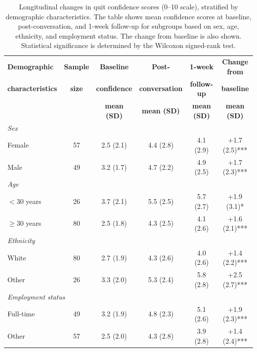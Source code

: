 \begin{table}[ht!]
  \centering
  \small
  \renewcommand{\arraystretch}{1.1}
  \begin{tabular*}{\linewidth}{@{\extracolsep{\fill}}lccccc@{}}
    \toprule
    \textbf{Demographic} & \textbf{Sample} & \textbf{Baseline} & \textbf{Post-} & \textbf{1-week} & \textbf{Change from} \\
    \textbf{characteristics} & \textbf{size} & \textbf{confidence} & \textbf{conversation} & \textbf{follow-up} & \textbf{baseline} \\
    & & \textbf{mean (SD)} & \textbf{mean (SD)} & \textbf{mean (SD)} & \textbf{mean (SD)} \\
    \midrule
    \multicolumn{6}{l}{\textit{Sex}} \\
    \quad Female & 57 & 2.5 (2.1) & 4.4 (2.8) & 4.1 (2.9) & +1.7 (2.5)*** \\
    \quad Male & 49 & 3.2 (1.7) & 4.7 (2.2) & 4.9 (2.5) & +1.7 (2.3)*** \\
    \midrule
    \multicolumn{6}{l}{\textit{Age}} \\
    \quad $<30$ years & 26 & 3.7 (2.1) & 5.5 (2.5) & 5.7 (2.7) & +1.9 (3.1)* \\
    \quad $\geq30$ years & 80 & 2.5 (1.8) & 4.3 (2.5) & 4.1 (2.6) & +1.6 (2.1)*** \\
    \midrule
    \multicolumn{6}{l}{\textit{Ethnicity}} \\
    \quad White & 80 & 2.7 (1.9) & 4.3 (2.6) & 4.0 (2.6) & +1.4 (2.2)*** \\
    \quad Other & 26 & 3.3 (2.0) & 5.3 (2.4) & 5.8 (2.8) & +2.5 (2.7)*** \\
    \midrule
    \multicolumn{6}{l}{\textit{Employment status}} \\
    \quad Full-time & 49 & 3.2 (1.9) & 4.8 (2.3) & 5.1 (2.6) & +1.9 (2.3)*** \\
    \quad Other & 57 & 2.5 (2.0) & 4.3 (2.8) & 3.9 (2.8) & +1.4 (2.4)*** \\
    \bottomrule
  \end{tabular*}
  \caption[Confidence Changes by Demographics]{Longitudinal changes in quit confidence scores (0--10 scale), stratified by demographic characteristics. The table shows mean confidence scores at baseline, post-conversation, and 1-week follow-up for subgroups based on sex, age, ethnicity, and employment status. The change from baseline is also shown. Statistical significance is determined by the Wilcoxon signed-rank test.}
  \label{table:demographics_wise_conf}
\end{table}

